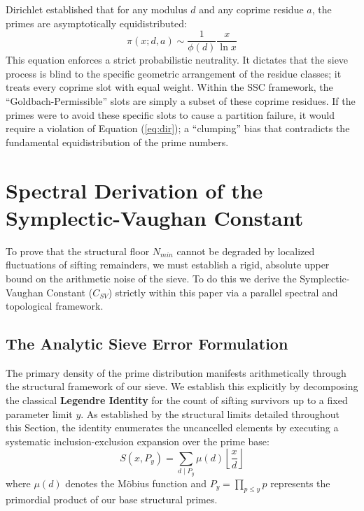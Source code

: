 \documentclass[sn-mathphys-num, pdflatex]{sn-jnl}
\begin{document}
Dirichlet established that for any modulus $d$ and any coprime residue $a$, the primes are asymptotically equidistributed:
\begin{equation}
\label{eq:dir}
\pi(x; d, a) \sim \frac{1}{\phi(d)} \frac{x}{\ln x}
\end{equation}
This equation enforces a strict probabilistic neutrality. It dictates that the sieve process is blind to the specific geometric arrangement of the residue classes; it treats every coprime slot with equal weight. Within the SSC framework, the ``Goldbach-Permissible'' slots are simply a subset of these coprime residues. If the primes were to avoid these specific slots to cause a partition failure, it would require a violation of Equation (\ref{eq:dir}); a ``clumping'' bias that contradicts the fundamental equidistribution of the prime numbers. 

\section{Spectral Derivation of the Symplectic-Vaughan Constant}
\label{sec:csv_derivation}

To prove that the structural floor $N_{min}$ cannot be degraded by localized fluctuations of sifting remainders, we must establish a rigid, absolute upper bound on the arithmetic noise of the sieve. To do this we derive the Symplectic-Vaughan Constant ($C_{SV}$) strictly within this paper via a parallel spectral and topological framework.

\subsection{The Analytic Sieve Error Formulation}
The primary density of the prime distribution manifests arithmetically through the structural framework of our sieve. We establish this explicitly by decomposing the classical \textbf{Legendre Identity} for the count of sifting survivors up to a fixed parameter limit $y$. As established by the structural limits detailed throughout this Section, the identity enumerates the uncancelled elements by executing a systematic inclusion-exclusion expansion over the prime base:
\begin{equation*}
S(x, P_y) = \sum_{d \mid P_y} \mu(d) \left\lfloor \frac{x}{d} \right\rfloor
\end{equation*}
where $\mu(d)$ denotes the Möbius function and $P_y = \prod_{p \le y} p$ represents the primordial product of our base structural primes. 
\end{document}

